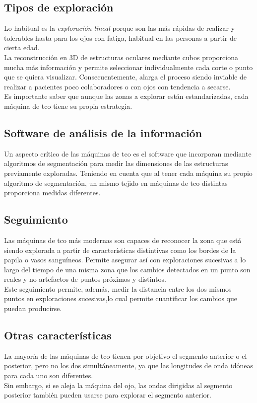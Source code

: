\subsection{Tipos de exploración}\label{tco:exploracion}
Lo habitual es la \emph{exploración lineal} porque son las más rápidas
de realizar y tolerables hasta para los ojos con
fatiga, habitual en las personas a partir de cierta edad.\\
La reconstrucción en 3D de estructuras oculares mediante cubos
proporciona mucha más información y permite seleccionar
individualmente cada corte o punto que se quiera
visualizar. Consecuentemente, alarga el proceso siendo inviable de
realizar a pacientes poco colaboradores o con ojos con tendencia a
secarse.\\
Es importante saber que aunque las zonas a explorar están
estandarizadas, cada máquina de \gls{tco} tiene su propia estrategia.

\subsection{Software de análisis de la información}
Un aspecto crítico de las máquinas de \gls{tco} es el software que
incorporan mediante algoritmos de segmentación para medir las
dimensiones de las estructuras previamente exploradas. Teniendo en
cuenta que al tener cada máquina su propio algoritmo de segmentación,
un mismo tejido en máquinas de \gls{tco} distintas proporciona medidas
diferentes.

\subsection{Seguimiento}\label{tco:seguimiento}
Las máquinas de \gls{tco} más modernas son capaces de reconocer la
zona que está siendo explorada a partir de características distintivas
como los bordes de la papila o vasos sanguíneos. Permite asegurar así
con exploraciones sucesivas a lo largo del tiempo de una misma zona
que los cambios detectados en un punto son reales y no artefactos de
puntos próximos y distintos.\\
Este seguimiento permite, además, medir la distancia entre los dos
mismos puntos en exploraciones sucesivas,lo cual permite cuantificar
los cambios que puedan producirse.

\subsection{Otras características}
La mayoría de las máquinas de \gls{tco} tienen por objetivo el
segmento anterior o el posterior, pero no los dos simultáneamente, ya
que las longitudes de onda idóneas para cada uno son diferentes.\\
Sin embargo, si se aleja la máquina del ojo, las ondas dirigidas al
segmento posterior también pueden usarse para explorar el segmento
anterior.

